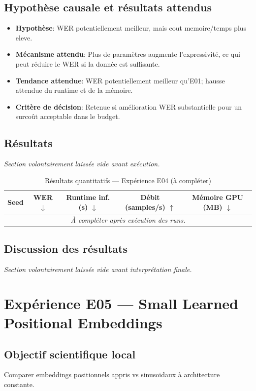 \documentclass[11pt,a4paper]{article}
\begin{document}
\subsection{Hypothèse causale et résultats attendus}
\begin{itemize}[leftmargin=1.2cm]
\item \textbf{Hypothèse}: WER potentiellement meilleur, mais cout memoire/temps plus eleve.
\item \textbf{Mécanisme attendu}: Plus de paramètres augmente l'expressivité, ce qui peut réduire le WER si la donnée est suffisante.
\item \textbf{Tendance attendue}: WER potentiellement meilleur qu'E01; hausse attendue du runtime et de la mémoire.
\item \textbf{Critère de décision}: Retenue si amélioration WER substantielle pour un surcoût acceptable dans le budget.
\end{itemize}

\subsection{Résultats}
\textit{Section volontairement laissée vide avant exécution.}

\begin{table}[H]
\centering
\caption{Résultats quantitatifs --- Expérience E04 (à compléter)}
\begin{tabular}{lcccc}
\toprule
Seed & WER $\downarrow$ & Runtime inf. (s) $\downarrow$ & Débit (samples/s) $\uparrow$ & Mémoire GPU (MB) $\downarrow$ \\
\midrule
\multicolumn{5}{c}{\textit{À compléter après exécution des runs.}} \\
\bottomrule
\end{tabular}
\end{table}

\subsection{Discussion des résultats}
\textit{Section volontairement laissée vide avant interprétation finale.}


\section{Expérience E05 --- Small Learned Positional Embeddings}
\subsection{Objectif scientifique local}
Comparer embeddings positionnels appris vs sinusoïdaux à architecture constante.
\end{document}
